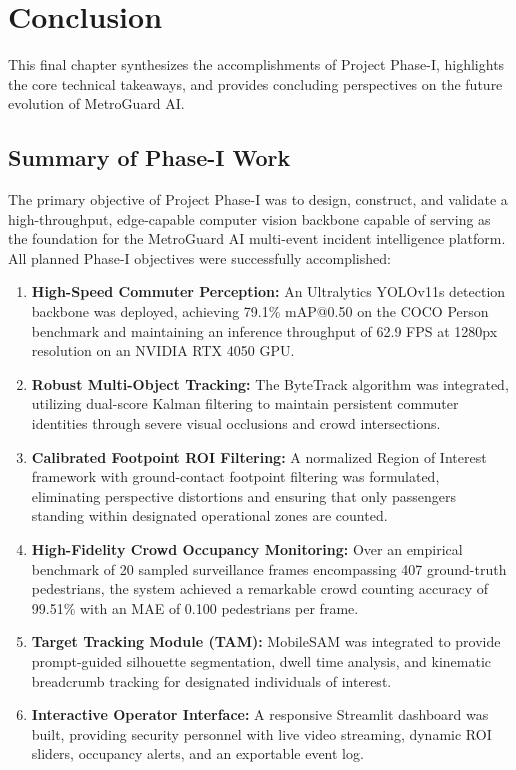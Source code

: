 \documentclass[12pt,a4paper]{report}
\begin{document}
\chapter{Conclusion}
\noindent This final chapter synthesizes the accomplishments of Project Phase-I, highlights the core technical takeaways, and provides concluding perspectives on the future evolution of MetroGuard AI.

\section{Summary of Phase-I Work}
The primary objective of Project Phase-I was to design, construct, and validate a high-throughput, edge-capable computer vision backbone capable of serving as the foundation for the MetroGuard AI multi-event incident intelligence platform. All planned Phase-I objectives were successfully accomplished:
\begin{enumerate}
    \item \textbf{High-Speed Commuter Perception:} An Ultralytics YOLOv11s detection backbone was deployed, achieving 79.1\% mAP@0.50 on the COCO Person benchmark and maintaining an inference throughput of 62.9 FPS at 1280px resolution on an NVIDIA RTX 4050 GPU.
    \item \textbf{Robust Multi-Object Tracking:} The ByteTrack algorithm was integrated, utilizing dual-score Kalman filtering to maintain persistent commuter identities through severe visual occlusions and crowd intersections.
    \item \textbf{Calibrated Footpoint ROI Filtering:} A normalized Region of Interest framework with ground-contact footpoint filtering was formulated, eliminating perspective distortions and ensuring that only passengers standing within designated operational zones are counted.
    \item \textbf{High-Fidelity Crowd Occupancy Monitoring:} Over an empirical benchmark of 20 sampled surveillance frames encompassing 407 ground-truth pedestrians, the system achieved a remarkable crowd counting accuracy of 99.51\% with an MAE of 0.100 pedestrians per frame.
    \item \textbf{Target Tracking Module (TAM):} MobileSAM was integrated to provide prompt-guided silhouette segmentation, dwell time analysis, and kinematic breadcrumb tracking for designated individuals of interest.
    \item \textbf{Interactive Operator Interface:} A responsive Streamlit dashboard was built, providing security personnel with live video streaming, dynamic ROI sliders, occupancy alerts, and an exportable event log.
\end{enumerate}
\end{document}
